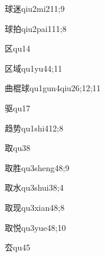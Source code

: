 \begin{verbete}{球迷}{qiu2mi2}{11;9}
\end{verbete}

\begin{verbete}{球拍}{qiu2pai1}{11;8}
\end{verbete}

\begin{verbete}{区}{qu1}{4}
\end{verbete}

\begin{verbete}{区域}{qu1yu4}{4;11}
\end{verbete}

\begin{verbete}{曲棍球}{qu1gun4qiu2}{6;12;11}
\end{verbete}

\begin{verbete}{驱}{qu1}{7}
\end{verbete}

\begin{verbete}{趋势}{qu1shi4}{12;8}
\end{verbete}

\begin{verbete}{取}{qu3}{8}
\end{verbete}

\begin{verbete}{取胜}{qu3sheng4}{8;9}
\end{verbete}

\begin{verbete}{取水}{qu3shui3}{8;4}
\end{verbete}

\begin{verbete}{取现}{qu3xian4}{8;8}
\end{verbete}

\begin{verbete}{取悦}{qu3yue4}{8;10}
\end{verbete}

\begin{verbete}{厺}{qu4}{5}
\end{verbete}


